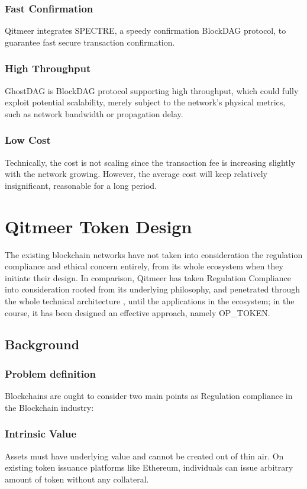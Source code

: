 \documentclass[a4paper,11pt]{article}
\begin{document}
\subsubsection*{Fast Confirmation}
Qitmeer integrates SPECTRE, a speedy confirmation BlockDAG protocol, to guarantee fast secure transaction confirmation. 
\subsubsection*{High Throughput}
GhostDAG is BlockDAG protocol supporting high throughput, which could fully exploit potential scalability, merely subject to the network’s physical metrics, such as network bandwidth or propagation delay.
\subsubsection*{Low Cost}
Technically, the cost is not scaling since the transaction fee is increasing slightly with the network growing. However, the average cost will keep relatively insignificant, reasonable for a long period.  

\section{Qitmeer Token Design}
The existing blockchain networks have not taken into consideration the  regulation compliance and ethical concern entirely, from its whole ecosystem when they initiate their design. In comparison, Qitmeer has taken Regulation Compliance into consideration rooted from its underlying philosophy, and penetrated through the whole technical architecture , until the applications in the ecosystem; in the course,  it has been designed an effective approach, namely OP_TOKEN.

\subsection{Background}
\subsubsection{Problem definition}

Blockchains are ought to consider two main points as Regulation compliance in the Blockchain industry:

\subsubsection*{Intrinsic Value}
Assets must have underlying value and cannot be created out of thin air. On existing token issuance platforms like Ethereum\cite{Ethereum}, individuals can issue arbitrary amount of token without any collateral.
 
\end{document}
